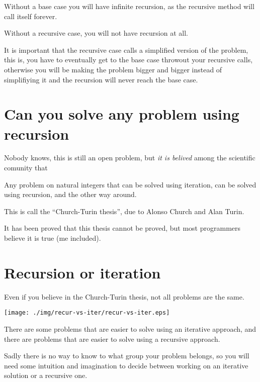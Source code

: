 \documentclass[a4paper, 9pt]{extarticle}
\begin{document}
Without a base case you will have infinite recursion, as the recursive method
will call itself forever.

Without a recursive case, you will not have recursion at all.

It is important that the recursive case calls a simplified version of the
problem, this is, you have to eventually get to the base case throwout your
recursive calls, otherwise you will be making the problem bigger and bigger
instead of simplifiying it and the recursion will never reach the base case.




\section{Can you solve any problem using recursion}

Nobody knows, this is still an open problem, but \emph{it is belived} among the
scientific comunity that

\begin{blackboard}
Any problem on natural integers that can be solved using
iteration, can be solved using recursion, and the other way around.
\end{blackboard}

This is call the ``Church-Turin thesis'', due to Alonso Church and Alan Turin.

It has been proved that this thesis cannot be proved, but most programmers
believe it is true (me included).






\section{Recursion or iteration}

Even if you believe in the Church-Turin thesis, not all problems are the same.

\begin{center}
  \texttt{[image: ./img/recur-vs-iter/recur-vs-iter.eps]}
\end{center}

There are some problems that are easier to solve using an iterative approach,
and there are problems that are easier to solve using a recursive approach.

Sadly there is no way to know to what group your problem belongs, so you will
need some intuition and imagination to decide between working on an iterative
solution or a recursive one.
\end{document}
